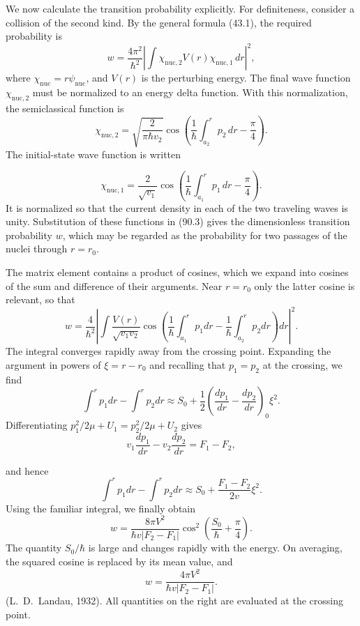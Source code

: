 We now calculate the transition probability explicitly. For definiteness, consider a collision of the second kind. By the general formula (43.1), the required probability is
\begin{equation}w=\frac{4\pi^2}{\hbar^2}\left|\int\chi_{\text{nuc},2}V(r)\chi_{\text{nuc},1}\,dr\right|^2,\tag{90.3}\end{equation}
where $\chi_{\text{nuc}}=r\psi_{\text{nuc}}$, and $V(r)$ is the perturbing energy. The final wave function $\chi_{\text{nuc},2}$ must be normalized to an energy delta function. With this normalization, the semiclassical function is
\begin{equation}\chi_{\text{nuc},2}=\sqrt{\frac2{\pi\hbar v_2}}\cos\left(\frac1\hbar\int_{a_2}^r p_2\,dr-\frac\pi4\right).\tag{90.4}\end{equation}
The initial-state wave function is written

\begin{equation}\chi_{\text{nuc},1}=\frac2{\sqrt{v_1}}\cos\left(\frac1\hbar\int_{a_1}^r p_1\,dr-\frac\pi4\right).\tag{90.5}\end{equation}
It is normalized so that the current density in each of the two traveling waves is unity. Substitution of these functions in (90.3) gives the dimensionless transition probability $w$, which may be regarded as the probability for two passages of the nuclei through $r=r_0$.

The matrix element contains a product of cosines, which we expand into cosines of the sum and difference of their arguments. Near $r=r_0$ only the latter cosine is relevant, so that
\[
w=\frac4{\hbar^2}\left|\int\frac{V(r)}{\sqrt{v_1v_2}}\cos\left(\frac1\hbar\int_{a_1}^r p_1dr-\frac1\hbar\int_{a_2}^r p_2dr\right)dr\right|^2.
\]
The integral converges rapidly away from the crossing point. Expanding the argument in powers of $\xi=r-r_0$ and recalling that $p_1=p_2$ at the crossing, we find
\[
\int^r p_1dr-\int^r p_2dr\approx S_0+\frac12\left(\frac{dp_1}{dr}-\frac{dp_2}{dr}\right)_0\xi^2.
\]
Differentiating $p_1^2/2\mu+U_1=p_2^2/2\mu+U_2$ gives
\[
v_1\frac{dp_1}{dr}-v_2\frac{dp_2}{dr}=F_1-F_2,
\]

and hence
\[
\int^r p_1dr-\int^r p_2dr\approx S_0+\frac{F_1-F_2}{2v}\xi^2.
\]
Using the familiar integral, we finally obtain
\begin{equation}w=\frac{8\pi V^2}{\hbar v|F_2-F_1|}\cos^2\left(\frac{S_0}{\hbar}+\frac\pi4\right).\tag{90.6}\end{equation}
The quantity $S_0/\hbar$ is large and changes rapidly with the energy. On averaging, the squared cosine is replaced by its mean value, and
\begin{equation}w=\frac{4\pi V^2}{\hbar v|F_2-F_1|}.\tag{90.7}\end{equation}
(L.~D.~Landau, 1932). All quantities on the right are evaluated at the crossing point.

